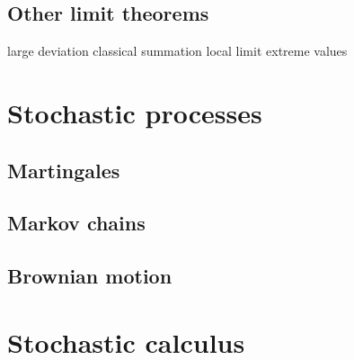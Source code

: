 \documentclass{../note}
\begin{document}
\chapter{Other limit theorems}

large deviation
classical summation
local limit
extreme values

\part{Stochastic processes}
\chapter{Martingales}
\chapter{Markov chains}
\chapter{Brownian motion}

\part{Stochastic calculus}
\end{document}
